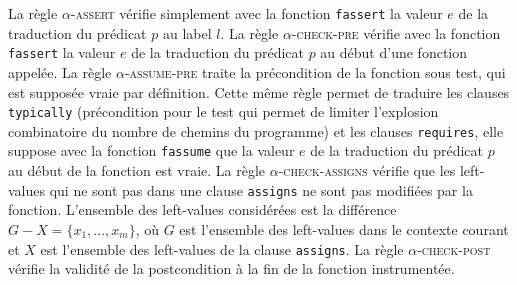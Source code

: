 La règle \textsc{$\alpha$-assert} vérifie simplement avec la fonction
\lstinline'fassert' la valeur $e$ de la traduction du prédicat $p$ au label $l$.
La règle \textsc{$\alpha$-check-pre} vérifie avec la fonction
\lstinline'fassert' la valeur $e$ de la traduction du prédicat $p$ au début
d'une fonction appelée.
La règle \textsc{$\alpha$-assume-pre} traite la précondition de la fonction sous
test, qui est supposée vraie par définition.
Cette même règle permet de traduire les clauses \lstinline'typically'
(précondition pour le test qui permet de limiter l'explosion combinatoire du
nombre de chemins du programme) et les clauses \lstinline'requires', elle
suppose avec la fonction \lstinline'fassume' que la valeur $e$ de la
traduction du prédicat $p$ au début de la fonction est vraie.
La règle \textsc{$\alpha$-check-assigns} vérifie que les left-values qui ne sont
pas dans une clause \lstinline'assigns' ne sont pas modifiées par la fonction.
L'ensemble des left-values considérées est la différence
$G-X = \{x_1, ..., x_m\}$, où $G$ est l'ensemble des left-values dans le
contexte courant et $X$ est l'ensemble des left-values de la clause
\lstinline'assigns'.
La règle \textsc{$\alpha$-check-post} vérifie la validité de la postcondition
à la fin de la fonction instrumentée.




